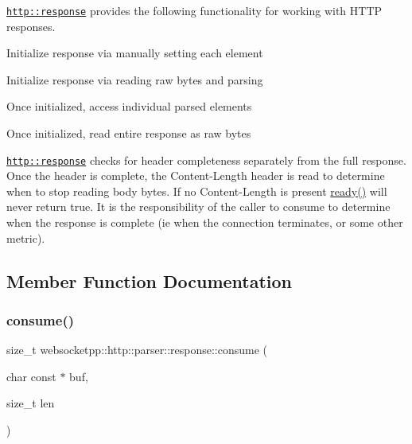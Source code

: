 \href{http::response}{\tt http\+::response} provides the following functionality for working with H\+T\+TP responses.


\begin{DoxyItemize}
\item Initialize response via manually setting each element
\item Initialize response via reading raw bytes and parsing
\item Once initialized, access individual parsed elements
\item Once initialized, read entire response as raw bytes
\end{DoxyItemize}

\href{http::response}{\tt http\+::response} checks for header completeness separately from the full response. Once the header is complete, the Content-\/\+Length header is read to determine when to stop reading body bytes. If no Content-\/\+Length is present \mbox{\hyperlink{classwebsocketpp_1_1http_1_1parser_1_1response_ab3f1f2bb2c79a779a8e7d649ea722421}{ready()}} will never return true. It is the responsibility of the caller to consume to determine when the response is complete (ie when the connection terminates, or some other metric). 

\subsection{Member Function Documentation}
\mbox{\label{classwebsocketpp_1_1http_1_1parser_1_1response_ae99b8f1287898b74d1963b95347ab838}} 
\subsubsection{\texorpdfstring{consume()}{consume()}\hspace{0.1cm}{\footnotesize\ttfamily [1/2]}}
{\footnotesize\ttfamily size\+\_\+t websocketpp\+::http\+::parser\+::response\+::consume (\begin{DoxyParamCaption}\item[{char const $\ast$}]{buf,  }\item[{size\+\_\+t}]{len }\end{DoxyParamCaption})\hspace{0.3cm}{\ttfamily [inline]}}



